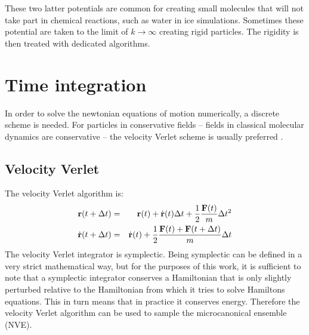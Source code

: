 These two latter potentials are common for creating small molecules that will not take part in chemical reactions, such as water in ice simulations. Sometimes these potential are taken to the limit of $k\to\infty$ creating rigid particles. The rigidity is then treated with dedicated algorithms.

\section{Time integration}
In order to solve the newtonian equations of motion numerically, a discrete scheme is needed. For particles in conservative fields -- fields in classical molecular dynamics are conservative -- the velocity Verlet scheme is usually preferred \cite[p.69]{frenkel2001understanding}. 

\subsection{Velocity Verlet}
The velocity Verlet algorithm is:
\begin{align*}
	\mathbf{r}(t+\Delta t) &=& \mathbf{r}(t) + \dot{\mathbf{r}}(t)\Delta t + \frac{1}{2}\frac{\mathbf{F}(t)}{m}\Delta t^2 \\
	\dot{\mathbf{r}}(t + \Delta t) &=& \dot{\mathbf{r}}(t) + \frac{1}{2} \frac{\mathbf{F}(t) + \mathbf{F}(t+\Delta t)}{m}\Delta t
\end{align*}
The velocity Verlet integrator is symplectic. Being symplectic can be defined in a very strict mathematical way, but for the purposes of this work, it is sufficient to note that a symplectic integrator conserves a Hamiltonian that is only slightly perturbed relative to the Hamiltonian from which it tries to solve Hamiltons equations. This in turn means that in practice it conserves energy. Therefore the velocity Verlet algorithm can be used to sample the microcanonical ensemble (NVE).

